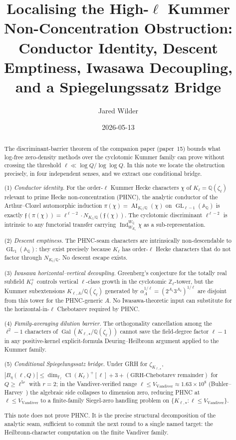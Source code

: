 \documentclass[11pt]{article}
\title{Localising the High-\(\ell\) Kummer Non-Concentration Obstruction:\\
Conductor Identity, Descent Emptiness, Iwasawa Decoupling, and a Spiegelungssatz Bridge}
\author{Jared Wilder}
\date{2026-05-13}
\newcommand{\Z}{\mathbb Z}
\newcommand{\Q}{\mathbb Q}
\newcommand{\F}{\mathbb F}
\newcommand{\A}{\mathbb A}
\newcommand{\Gal}{\operatorname{Gal}}
\newcommand{\Ind}{\operatorname{Ind}}
\newcommand{\AI}{\operatorname{AI}}
\newcommand{\Cl}{\operatorname{Cl}}
\newcommand{\GL}{\operatorname{GL}}
\begin{document}
\maketitle

\begin{abstract}
The discriminant-barrier theorem of the companion paper (paper~15) bounds what log-free zero-density methods over the cyclotomic Kummer family can prove without crossing the threshold \(\ell\ll\log Q/\log\log Q\).  In this note we locate the obstruction precisely, in four independent senses, and we extract one conditional bridge.

(1) \emph{Conductor identity.}  For the order-\(\ell\) Kummer Hecke characters \(\chi\) of \(K_\ell=\Q(\zeta_\ell)\) relevant to prime Hecke non-concentration (PHNC), the analytic conductor of the Arthur--Clozel automorphic induction \(\pi(\chi)=\AI_{K_\ell/\Q}(\chi)\) on \(\GL_{\ell-1}(\A_\Q)\) is exactly
\(\mathfrak f(\pi(\chi))=\ell^{\ell-2}\cdot N_{K_\ell/\Q}(\mathfrak f(\chi))\).
The cyclotomic discriminant \(\ell^{\ell-2}\) is intrinsic to any functorial transfer carrying \(\Ind_{W_{K_\ell}}^{W_\Q}\chi\) as a sub-representation.

(2) \emph{Descent emptiness.}  The PHNC-seam characters are intrinsically non-descendable to \(\GL_1(\A_\Q)\): they exist precisely because \(K_\ell\) has order-\(\ell\) Hecke characters that do not factor through \(N_{K_\ell/\Q}\).  No descent escape exists.

(3) \emph{Iwasawa horizontal--vertical decoupling.}  Greenberg's conjecture for the totally real subfield \(K_\ell^+\) controls vertical \(\ell\)-class growth in the cyclotomic \(\Z_\ell\)-tower, but the Kummer subextensions \(K_{\ell,A}/\Q(\zeta_\ell)\) generated by \(\alpha_A^{1/\ell}=(2^{A_1}3^{A_2})^{1/\ell}\) are disjoint from this tower for the PHNC-generic \(A\).  No Iwasawa-theoretic input can substitute for the horizontal-in-\(\ell\) Chebotarev required by PHNC.

(4) \emph{Family-averaging dilution barrier.}  The orthogonality cancellation among the \(\ell^2-1\) characters of \(\Gal(K_{\ell,\star}/\Q(\zeta_\ell))\) cannot save the field-degree factor \(\ell-1\) in any positive-kernel explicit-formula Deuring--Heilbronn argument applied to the Kummer family.

(5) \emph{Conditional Spiegelungssatz bridge.}  Under GRH for \(\zeta_{K_{\ell,\star}}\),
\(|B_\eta(\ell,Q)|\le\dim_{\F_\ell}\Cl(K_\ell)^+[\ell]+3+(\text{GRH-Chebotarev remainder})\)
for \(Q\ge\ell^{5r}\) with \(r=2\); in the Vandiver-verified range \(\ell\le V_{\mathrm{Vandiver}}\approx 1.63\times 10^8\) (Buhler--Harvey~\cite{BuhlerHarvey}) the algebraic side collapses to dimension zero, reducing PHNC at \(\ell\le V_{\mathrm{Vandiver}}\) to a finite-family Siegel-zero handling problem on \(\{K_{\ell,\star}\colon\ell\le V_{\mathrm{Vandiver}}\}\).

This note does not prove PHNC.  It is the precise structural decomposition of the analytic seam, sufficient to commit the next round to a single named target: the Heilbronn-character computation on the finite Vandiver family.
\end{abstract}
\end{document}
